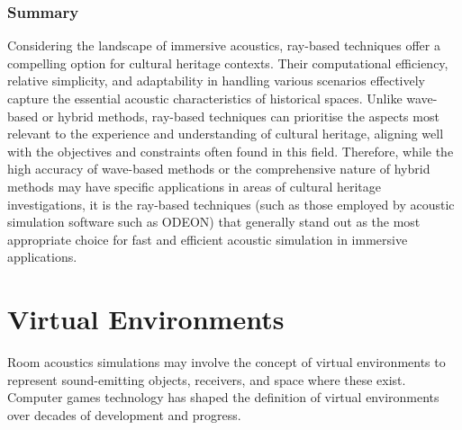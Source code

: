 \subsubsection{Summary}
Considering the landscape of immersive acoustics, ray-based techniques offer a compelling option for cultural heritage contexts. Their computational efficiency, relative simplicity, and adaptability in handling various scenarios effectively capture the essential acoustic characteristics of historical spaces. Unlike wave-based or hybrid methods, ray-based techniques can prioritise the aspects most relevant to the experience and understanding of cultural heritage, aligning well with the objectives and constraints often found in this field. Therefore, while the high accuracy of wave-based methods or the comprehensive nature of hybrid methods may have specific applications in areas of cultural heritage investigations, it is the ray-based techniques (such as those employed by acoustic simulation software such as ODEON) that generally stand out as the most appropriate choice for fast and efficient acoustic simulation in immersive applications.

\section{Virtual Environments}
Room acoustics simulations may involve the concept of virtual environments to represent sound-emitting objects, receivers, and space where these exist. Computer games technology has shaped the definition of virtual environments over decades of development and progress.


